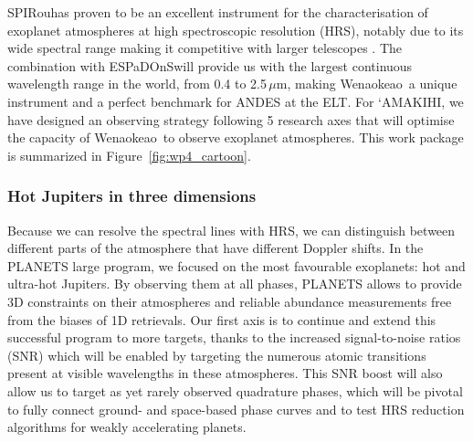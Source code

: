 \documentclass[
    traditabstract,
    longauth,
    onecolumn,
]{aa}
\def \amakihi{`AMAKIHI}
\def \spi{SPIRou}
\def \esp{ESPaDOnS}
\def \wena{Wenaokeao}
\begin{document}


\spi has proven to be an excellent instrument for the characterisation of exoplanet atmospheres at high spectroscopic resolution (HRS), notably due to its wide spectral range making it competitive with larger telescopes \citep{snellen_exoplanet_2025}.  The combination with \esp will provide us with the largest continuous wavelength range in the world, from 0.4 to 2.5\,$\mu$m, making \wena\ a unique instrument and a perfect benchmark for ANDES at the ELT. For \amakihi, we have designed an observing strategy following 5 research axes that will optimise the capacity of \wena\ to observe exoplanet atmospheres. This work package is summarized in Figure~\ref{fig:wp4_cartoon}.


\subsubsection*{Hot Jupiters in three dimensions}
Because we can resolve the spectral lines with HRS, we can distinguish between different parts of the atmosphere that have different Doppler shifts. In the PLANETS large program, we focused on the most favourable exoplanets: hot and ultra-hot Jupiters. By observing them at all phases, PLANETS allows to provide 3D constraints on their atmospheres and reliable abundance measurements free from the biases of 1D retrievals. Our first axis is  to continue and extend this successful program to more targets, thanks to the increased signal-to-noise ratios (SNR) which will be enabled by targeting the numerous atomic transitions present at visible wavelengths in these atmospheres. This SNR boost will also allow us to target as yet rarely observed quadrature phases, which will be pivotal to fully connect ground- and space-based phase curves and to test HRS reduction algorithms for weakly accelerating planets.	
\end{document}
